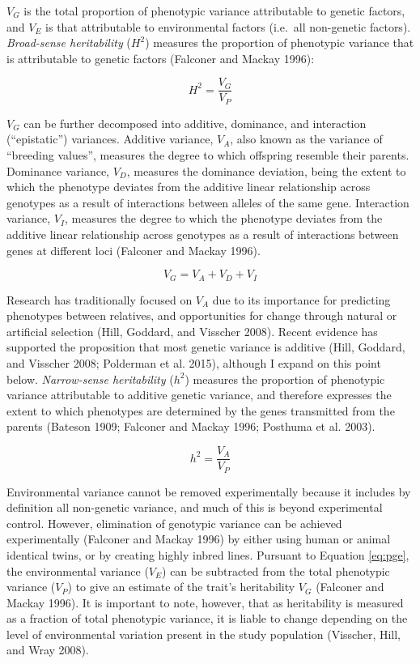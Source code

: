 \documentclass[
]{book}
\begin{document}
\(V_{G}\) is the total proportion of phenotypic variance attributable to genetic factors, and \(V_{E}\) is that attributable to environmental factors (i.e.~all non-genetic factors). \emph{Broad-sense heritability} (\(H^2\)) measures the proportion of phenotypic variance that is attributable to genetic factors (Falconer and Mackay 1996):

\begin{equation}
H^2 = \frac{V_G}{V_P} \label{eq:heritbs}
\end{equation}

\(V_{G}\) can be further decomposed into additive, dominance, and interaction (``epistatic'') variances. Additive variance, \(V_A\), also known as the variance of ``breeding values'', measures the degree to which offspring resemble their parents. Dominance variance, \(V_D\), measures the dominance deviation, being the extent to which the phenotype deviates from the additive linear relationship across genotypes as a result of interactions between alleles of the same gene. Interaction variance, \(V_I\), measures the degree to which the phenotype deviates from the additive linear relationship across genotypes as a result of interactions between genes at different loci (Falconer and Mackay 1996).

\begin{equation}
V_G = V_A + V_D + V_I \label{eq:gendecomp}
\end{equation}

Research has traditionally focused on \(V_A\) due to its importance for predicting phenotypes between relatives, and opportunities for change through natural or artificial selection (Hill, Goddard, and Visscher 2008). Recent evidence has supported the proposition that most genetic variance is additive (Hill, Goddard, and Visscher 2008; Polderman et al. 2015), although I expand on this point below. \emph{Narrow-sense heritability} (\(h^2\)) measures the proportion of phenotypic variance attributable to additive genetic variance, and therefore expresses the extent to which phenotypes are determined by the genes transmitted from the parents (Bateson 1909; Falconer and Mackay 1996; Posthuma et al. 2003).

\begin{equation}
h^2 = \frac{V_A}{V_P} \label{eq:heritns}
\end{equation}

Environmental variance cannot be removed experimentally because it includes by definition all non-genetic variance, and much of this is beyond experimental control. However, elimination of genotypic variance can be achieved experimentally (Falconer and Mackay 1996) by either using human or animal identical twins, or by creating highly inbred lines. Pursuant to Equation \eqref{eq:pge}, the environmental variance (\(V_E\)) can be subtracted from the total phenotypic variance (\(V_P\)) to give an estimate of the trait's heritability \(V_G\) (Falconer and Mackay 1996). It is important to note, however, that as heritability is measured as a fraction of total phenotypic variance, it is liable to change depending on the level of environmental variation present in the study population (Visscher, Hill, and Wray 2008).
\end{document}
